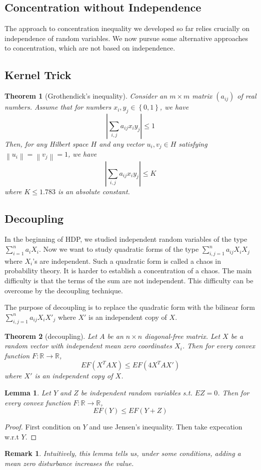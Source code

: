 \documentclass{article}
\newtheorem{Thm}{Theorem}[section]
\newtheorem{Lem}{Lemma}[section]
\newtheorem*{Rk}{Remark}
\theoremstyle{definition}
\begin{document}
\subsection{Concentration without Independence}
The approach to concentration inequality we developed so far relies crucially on independence of random variables.
We now pursue some alternative approaches to concentration, which are not based on independence.


\subsection{Kernel Trick}
\begin{Thm}[Grothendick's inequality]
    Consider an $m\times m$ matrix $(a_{ij})$ of real numbers. Assume that for numbers $x_i,y_j\in\left\{0,1\right\}$,
    we have \[\left|\sum_{i,j}a_{ij}x_iy_j\right|\le 1\] 
    Then, for any Hilbert space $H$ and any vector $u_i,v_j\in H$ satisfying $\left\|u_i\right\|=\left\|v_j\right\|=1$,
    we have \[\left|\sum_{i,j}a_{ij}x_iy_j\right|\le K\] 
    where $K\le 1.783$ is an absolute constant.
\end{Thm}

\subsection{Decoupling}
In the beginning of HDP, we studied independent random variables of the type $\sum_{i=1}^n a_iX_i$.
Now we want to study quadratic forms of the type $\sum_{i,j=1}^na_{ij}X_iX_j$ where $X_i$'s are independent. Such a quadratic form is called a chaos in probability theory.
It is harder to establish a concentration of a chaos. The main difficulty is that the terms of the sum are not independent.
This difficulty can be overcome by the decoupling technique.\par 
The purpose of decoupling is to replace the quadratic form with the bilinear form $\sum_{i,j=1}^na_{ij}X_iX'_j$ where $X'$ is an independent copy of $X$.
\begin{Thm}[decoupling]
    Let $A$ be an $n\times n$ diagonal-free matrix. Let $X$ be a random vector with independent mean zero coordinates $X_i$.
    Then for every convex function $F:\mathbb{R}\to \mathbb{R}$, 
    \[EF(X^TAX)\le EF(4X^TAX')\] 
    where $X'$ is an independent copy of $X$.
\end{Thm}

\begin{Lem}
    Let $Y$ and $Z$ be independent random variables s.t. $EZ=0$. Then for every convex function $F:\mathbb{R}\to\mathbb{R}$,
    \[EF(Y)\le EF(Y+Z)\]
\end{Lem}
\begin{proof}
    First condition on $Y$ and use Jensen's inequality. Then take expecation w.r.t $Y$.
\end{proof}
\begin{Rk}
    Intuitively, this lemma tells us, under some conditions, adding a mean zero disturbance increases the value.
\end{Rk}
\end{document}

